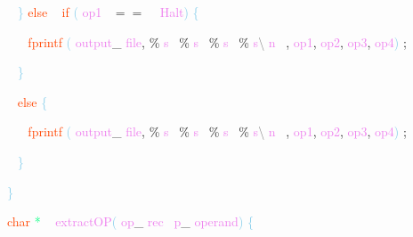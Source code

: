 \documentclass[8, usernames, dvipsnames]{beamer}
\begin{document}
\begin{frame}
\textcolor{White}{\   }
\textcolor{SkyBlue}{\} }
\textcolor{OrangeRed}{else}
\textcolor{White}{\ }
\textcolor{OrangeRed}{if}
\textcolor{SkyBlue}{(}
\textcolor{Violet}{op1}\textcolor{White}{\ }
\textcolor{OliveGreen}{$==$}
\textcolor{White}{\ }
\textcolor{Violet}{Halt}\textcolor{SkyBlue}{)}
\textcolor{SkyBlue}{\{ }

 \textcolor{White}{\   }
\textcolor{White}{\   }
\textcolor{OrangeRed}{fprintf}
\textcolor{SkyBlue}{(}
\textcolor{Violet}{output}\textcolor{Sepia}{\_}
\textcolor{Violet}{file}\textcolor{Sepia}{,}
\textcolor{Apricot}{\%}
\textcolor{Violet}{s}\textcolor{White}{\ }
\textcolor{Apricot}{\%}
\textcolor{Violet}{s}\textcolor{White}{\ }
\textcolor{Apricot}{\%}
\textcolor{Violet}{s}\textcolor{White}{\ }
\textcolor{Apricot}{\%}
\textcolor{Violet}{s}\textcolor{Gray}{\textbackslash }
\textcolor{Violet}{n}\textcolor{White}{\ }
\textcolor{Sepia}{,}
\textcolor{Violet}{op1}\textcolor{Sepia}{,}
\textcolor{Violet}{op2}\textcolor{Sepia}{,}
\textcolor{Violet}{op3}\textcolor{Sepia}{,}
\textcolor{Violet}{op4}\textcolor{SkyBlue}{)}
\textcolor{Sepia}{;}

 \textcolor{White}{\   }
\textcolor{SkyBlue}{\} }

 \textcolor{White}{\   }
\textcolor{OrangeRed}{else}
\textcolor{SkyBlue}{\{ }

 \textcolor{White}{\   }
\textcolor{White}{\   }
\textcolor{OrangeRed}{fprintf}
\textcolor{SkyBlue}{(}
\textcolor{Violet}{output}\textcolor{Sepia}{\_}
\textcolor{Violet}{file}\textcolor{Sepia}{,}
\textcolor{Apricot}{\%}
\textcolor{Violet}{s}\textcolor{White}{\ }
\textcolor{Apricot}{\%}
\textcolor{Violet}{s}\textcolor{White}{\ }
\textcolor{Apricot}{\%}
\textcolor{Violet}{s}\textcolor{White}{\ }
\textcolor{Apricot}{\%}
\textcolor{Violet}{s}\textcolor{Gray}{\textbackslash }
\textcolor{Violet}{n}\textcolor{White}{\ }
\textcolor{Sepia}{,}
\textcolor{Violet}{op1}\textcolor{Sepia}{,}
\textcolor{Violet}{op2}\textcolor{Sepia}{,}
\textcolor{Violet}{op3}\textcolor{Sepia}{,}
\textcolor{Violet}{op4}\textcolor{SkyBlue}{)}
\textcolor{Sepia}{;}

 \textcolor{White}{\   }
\textcolor{SkyBlue}{\} }

 
 \textcolor{SkyBlue}{\} }

 
 \textcolor{OrangeRed}{char}
\textcolor{SpringGreen}{*}
\textcolor{White}{\ }
\textcolor{Violet}{extractOP}\textcolor{SkyBlue}{(}
\textcolor{Violet}{op}\textcolor{Sepia}{\_}
\textcolor{Violet}{rec}\textcolor{White}{\ }
\textcolor{Violet}{p}\textcolor{Sepia}{\_}
\textcolor{Violet}{operand}\textcolor{SkyBlue}{)}
\textcolor{SkyBlue}{\{ }

 \end{frame}
\end{document}
